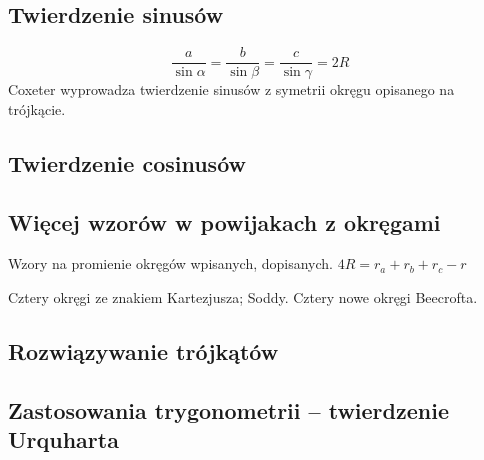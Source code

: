 \begin{theorem}
\end{theorem}



\subsection{Twierdzenie sinusów}

$$\frac{a}{\sin \alpha} = \frac{b}{\sin \beta} = \frac{c}{\sin \gamma} = 2R$$
Coxeter \cite[s. 28, 29]{coxeter_1967} wyprowadza twierdzenie sinusów z symetrii okręgu opisanego na trójkącie.

\subsection{Twierdzenie cosinusów}
%

%

\subsection{Więcej wzorów w powijakach z okręgami}
Wzory na promienie okręgów wpisanych, dopisanych.
$4R = r_a + r_b + r_c - r$ %

Cztery okręgi ze znakiem Kartezjusza; Soddy.
Cztery nowe okręgi Beecrofta.
%

\subsection{Rozwiązywanie trójkątów}


\subsection{Zastosowania trygonometrii -- twierdzenie Urquharta}


